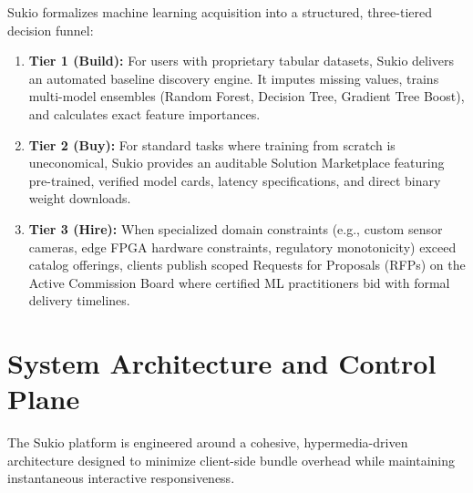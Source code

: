\documentclass[11pt,a4paper]{article}
\begin{document}
Sukio formalizes machine learning acquisition into a structured, three-tiered decision funnel:
\begin{enumerate}[leftmargin=0.7cm]
  \item \textbf{Tier 1 (Build):} For users with proprietary tabular datasets, Sukio delivers an automated baseline discovery engine. It imputes missing values, trains multi-model ensembles (Random Forest, Decision Tree, Gradient Tree Boost), and calculates exact feature importances.
  \item \textbf{Tier 2 (Buy):} For standard tasks where training from scratch is uneconomical, Sukio provides an auditable Solution Marketplace featuring pre-trained, verified model cards, latency specifications, and direct binary weight downloads.
  \item \textbf{Tier 3 (Hire):} When specialized domain constraints (e.g., custom sensor cameras, edge FPGA hardware constraints, regulatory monotonicity) exceed catalog offerings, clients publish scoped Requests for Proposals (RFPs) on the Active Commission Board where certified ML practitioners bid with formal delivery timelines.
\end{enumerate}

\section{System Architecture and Control Plane}
The Sukio platform is engineered around a cohesive, hypermedia-driven architecture designed to minimize client-side bundle overhead while maintaining instantaneous interactive responsiveness.
\end{document}
